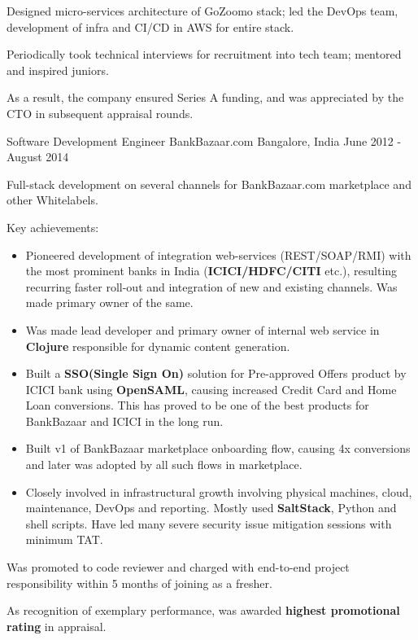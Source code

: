 \begin{cventries}
{\begin{cvitems}
\begin{itemize}
        \end{itemize}
        \item {Designed micro-services architecture of GoZoomo stack; led the DevOps team, development of infra and CI/CD in AWS for entire stack.}
        \item {Periodically took technical interviews for recruitment into tech team; mentored and inspired juniors.}
        \item {As a result, the company ensured Series A funding, and was appreciated by the CTO in subsequent appraisal rounds.}
      \end{cvitems}
    }

  \cventry
    {Software Development Engineer} %
    {BankBazaar.com} %
    {Bangalore, India} %
    {June 2012 - August 2014} %
    {
      \begin{cvitems} %
        \item {Full-stack development on several channels for BankBazaar.com marketplace and other Whitelabels.}
        \item {Key achievements:}
        \begin{itemize}
         \item {Pioneered development of integration web-services (REST/SOAP/RMI) with the most prominent banks in India (\textbf{ICICI/HDFC/CITI} etc.), resulting recurring faster roll-out and integration of new and existing channels. Was made primary owner of the same.}
         \item {Was made lead developer and primary owner of internal web service in \textbf{Clojure} responsible for dynamic content generation.}
         \item {Built a \textbf{SSO(Single Sign On)} solution for Pre-approved Offers product by ICICI bank using \textbf{OpenSAML}, causing increased Credit Card and Home Loan conversions. This has proved to be one of the best products for BankBazaar and ICICI in the long run.}
         \item {Built v1 of BankBazaar marketplace onboarding flow, causing 4x conversions and later was adopted by all such flows in marketplace.}
         \item {Closely involved in infrastructural growth involving physical machines, cloud, maintenance, DevOps and reporting. Mostly used \textbf{SaltStack}, Python and shell scripts. Have led many severe security issue mitigation sessions with minimum TAT.}
        \end{itemize}
        \item {Was promoted to code reviewer and charged with end-to-end project responsibility within 5 months of joining as a fresher.}
        \item {As recognition of exemplary performance, was awarded \textbf{highest promotional rating} in appraisal.}
      \end{cvitems}
    }


\end{cventries}
